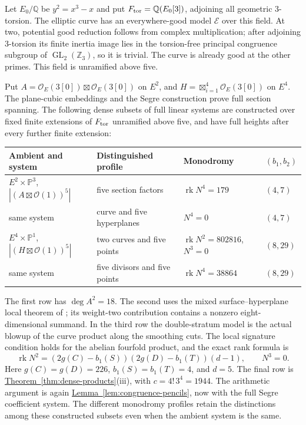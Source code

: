 \documentclass[11pt,a4paper]{article}
\theoremstyle{definition}
\theoremstyle{remark}\newtheorem{remark}[theorem]{Remark}
\numberwithin{equation}{section}
\newcommand{\Q}{\mathbb Q}\newcommand{\R}{\mathbb R}\newcommand{\C}{\mathbb C}
\newcommand{\Z}{\mathbb Z}
\newcommand{\PP}{\mathbb P}\newcommand{\LL}{\mathbb L}
\newcommand{\rk}{\operatorname{rk}}\newcommand{\im}{\operatorname{im}}
\newcommand{\thmref}[1]{\hyperref[#1]{\textcolor{resultlink}{Theorem~\ref*{#1}}}}
\newcommand{\lemref}[1]{\hyperref[#1]{\textcolor{resultlink}{Lemma~\ref*{#1}}}}
\begin{document}
Let $E_0/\Q$ be $y^2=x^3-x$ and put
$F_{\rm tor}=\Q(E_0[3])$, adjoining all geometric $3$-torsion.
The elliptic curve has an everywhere-good model $\mathcal E$
over this field. At two, potential good reduction follows from
complex multiplication; after adjoining $3$-torsion its finite
inertia image lies in the torsion-free principal congruence
subgroup of $\operatorname{GL}_2(\Z_3)$, so it is trivial. The
curve is already good at the other primes. This field is
unramified above five.

Put $A=\mathcal O_E(3[0])\boxtimes\mathcal O_E(3[0])$ on $E^2$,
and $H=\boxtimes_{i=1}^4\mathcal O_E(3[0])$ on $E^4$.
The plane-cubic embeddings and the Segre construction prove full
section spanning. The following dense subsets of full linear
systems are constructed over fixed finite extensions of
$F_{\rm tor}$ unramified above five, and have full heights after
every further finite extension:
\begin{center}
\begin{tabular}{llll}
\toprule
Ambient and system & Distinguished profile & Monodromy & $(b_1,b_2)$\\
\midrule
$E^2\times\PP^3$, $|(A\boxtimes\mathcal O(1))^5|$
 & five section factors & $\rk N^4=179$ & $(4,7)$\\
same system & curve and five hyperplanes & $N^4=0$ & $(4,7)$\\
$E^4\times\PP^1$, $|(H\boxtimes\mathcal O(1))^5|$
 & two curves and five points & $\rk N^2=802816$, $N^3=0$ & $(8,29)$\\
same system & five divisors and five points & $\rk N^4=38864$ & $(8,29)$\\
\bottomrule
\end{tabular}
\end{center}
The first row has $\deg A^2=18$. The second uses the mixed
surface--hyperplane local theorem of \cite{InternalMixedFamilies};
its weight-two contribution contains a nonzero eight-dimensional
summand. In the third row the double-stratum model is the actual
blowup of the curve product along the smoothing cuts. The local
signature condition holds for the abelian fourfold product, and
the exact rank formula is
\[
 \rk N^2=(2g(C)-b_1(S))(2g(D)-b_1(T))(d-1),\qquad N^3=0.
\]
Here $g(C)=g(D)=226$, $b_1(S)=b_1(T)=4$, and $d=5$.
The final row is \thmref{thm:dense-products}(iii), with
$c=4!\,3^4=1944$. The arithmetic argument is again
\lemref{lem:congruence-pencils}, now with the full Segre coefficient
system. The different monodromy profiles retain the distinctions
among these constructed subsets even when the ambient system is
the same.
\end{document}
